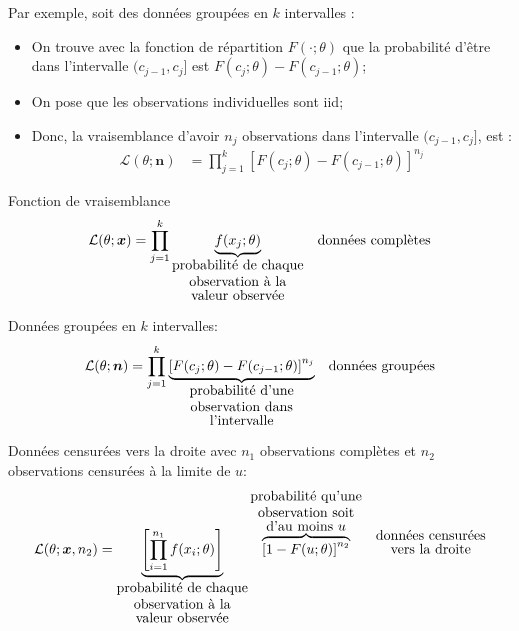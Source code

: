 \documentclass[10pt, french]{article}
\begin{document}
\begin{multicols*}{2}
Par exemple, soit des données groupées en $k$ intervalles : 
\begin{itemize}
	\item	On trouve avec la fonction de répartition $F(\cdot; \theta)$ que la probabilité d'être dans l'intervalle $(c_{j - 1}, c_{j}]$ est $F(c_{j}; \theta)	-	F(c_{j - 1}; \theta)$;
	\item	On pose que les observations individuelles sont iid;
	\item	Donc, la vraisemblance d'avoir $n_{j}$ observations dans l'intervalle $(c_{j - 1}, c_{j}]$,  est :
		\begin{align*}
		\mathcal{L}(\theta; \bm{n})
		&=	\prod^{k}_{j	=	1} \left[F(c_{j}; \theta)	-	F(c_{j - 1}; \theta)\right]^{n_{j}}
		\end{align*}
\end{itemize}


\setlength{\mathindent}{-0.75cm}
\begin{algo}{Fonction de vraisemblance}
\begin{align*}
	\mathcal{L}(\theta; \bm{x})
	&=	\prod^{k}_{j	=	1} \underbrace{f(x_{j}; \theta)}_{\shortstack{probabilité de chaque\\ observation à la\\ valeur observée}}	&
	\shortstack{données complètes}	
\end{align*}

\tcbline

Données groupées en $k$ intervalles:\\
\begin{align*}
	\mathcal{L}(\theta; \bm{n})
	&=	\prod^{k}_{j	=	1} \underbrace{\left[F(c_{j}; \theta)	-	F(c_{j - 1}; \theta)\right]^{n_{j}}}_{\shortstack{probabilité d'une\\ observation dans\\ l'intervalle}}		&
	\shortstack{données groupées}	
\end{align*}

\tcbline

Données censurées vers la droite avec $n_{1}$ observations complètes et $n_{2}$ observations censurées à la limite de $u$:\\
\begin{align*}
	\mathcal{L}(\theta; \bm{x}, n_{2})
	&=	\underbrace{\left[\prod^{n_{1}}_{i	=	1} f(x_{i}; \theta) \right]}_{\shortstack{probabilité de chaque\\ observation à la\\ valeur observée}} \overbrace{\left[1	-	F(u; \theta)\right]^{n_{2}}}^{\shortstack{probabilité qu'une\\ observation soit\\ d'au moins $u$}}		&
	\shortstack{données censurées\\ vers la droite}	\\
\end{align*}


\end{algo}
\end{multicols*}
\end{document}
